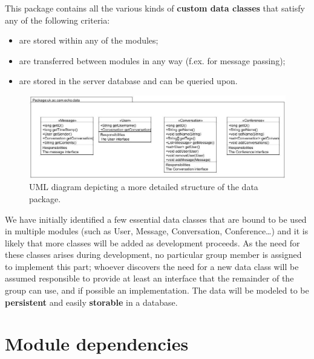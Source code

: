 \documentclass[12p, a4paper, onecolumn]{report}
\begin{document}
This package contains all the various kinds of \textbf{custom data classes} that satisfy any of the following criteria:
\begin{itemize}
\item are stored within any of the modules;
\item are transferred between modules in any way (f.ex. for message passing);
\item are stored in the server database and can be queried upon.
\end{itemize}
\begin{figure}[h]
  \centering
  \includegraphics[width=\textwidth]{UMLData.jpg}
  \caption{UML diagram depicting a more detailed structure of the data package.}
\end{figure}
We have initially identified a few essential data classes that are bound to be used in multiple modules (such as User, Message, Conversation, Conference…) and it is likely that more classes will be added as development proceeds. As the need for these classes arises during development, no particular group member is assigned to implement this part; whoever discovers the need for a new data class will be assumed responsible to provide at least an interface that the remainder of the group can use, and if possible an implementation. The data will be modeled to be \textbf{persistent} and easily \textbf{storable} in a database.

\section{Module dependencies}
\end{document}
